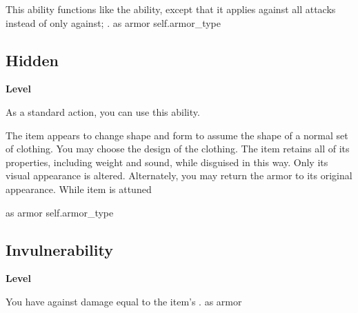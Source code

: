 \vspace{-1.5em}  %
This ability functions like the  ability, except that it applies against all attacks instead of only against; .
 
 as armor
 {self.armor_type}
\begin{multicols}{2}
\lowercase{\hypertarget{item:Hidden}{}}\label{item:Hidden}
\hypertarget{item:Hidden}{\subsection{Hidden}}
\columnbreak%
\begin{flushright}
\large\textbf{ Level}
\end{flushright}
\end{multicols}
\vspace{-1.5em}  %
As a standard action, you can use this ability.
\begin{spellcontent}
\begin{spelleffects}
\spelleffect
The item appears to change shape and form to assume the shape of a normal set of clothing.
You may choose the design of the clothing.
The item retains all of its properties, including weight and sound, while disguised in this way.
Only its visual appearance is altered.
Alternately, you may return the armor to its original appearance.
\spelldur While item is attuned
\end{spelleffects}
\end{spellcontent}
 
 as armor
 {self.armor_type}
\begin{multicols}{2}
\lowercase{\hypertarget{item:Invulnerability}{}}\label{item:Invulnerability}
\hypertarget{item:Invulnerability}{\subsection{Invulnerability}}
\columnbreak%
\begin{flushright}
\large\textbf{ Level}
\end{flushright}
\end{multicols}
\vspace{-1.5em}  %
You have  against  damage equal to the item's .
 
 as armor
